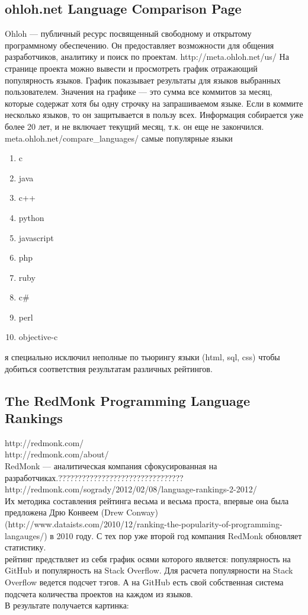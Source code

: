 \subsection{ohloh.net Language Comparison Page}
Ohloh --- публичный ресурс посвященный свободному и открытому программному обеспечению. Он предоставляет возможности для общения разработчиков, аналитику и поиск по проектам. 
http://meta.ohloh.net/us/
На странице проекта можно вывести и просмотреть график отражающий популярность языков.
График показывает результаты для языков выбранных пользователем. Значения на графике --- это сумма все коммитов за месяц, которые содержат хотя бы одну строчку на 
запрашиваемом языке. Если в коммите несколько языков, то он защитывается в пользу всех. Информация собирается уже более 20 лет, и не включает текущий месяц, т.к. он еще не закончился.\\
meta.ohloh.net/compare\_languages/
самые популярные языки\\
\begin{enumerate}
\item c
\item java
\item c++
\item python
\item javascript
\item php
\item ruby
\item c\#
\item perl
\item objective-c
\end{enumerate}
я специально исключил неполные по тьюрингу языки (html, sql, css) чтобы добиться соответствия результатам различных рейтингов.

\subsection{The RedMonk Programming Language Rankings}
http://redmonk.com/\\
http://redmonk.com/about/\\
RedMonk --- аналитическая компания сфокусированная на разработчиках.????????????????????????????????\\
http://redmonk.com/sogrady/2012/02/08/language-rankings-2-2012/\\
Их методика составления рейтинга весьма и весьма проста, впервые она была предложена Дрю Конвеем (Drew Conway) 
(http://www.dataists.com/2010/12/ranking-the-popularity-of-programming-langauges/) в 2010 году. С тех пор уже второй год компания RedMonk 
обновляет статистику.\\
рейтинг предствляет из себя график осями которого является: популярность на GitHub  и популярность на Stack Overflow.
Для расчета популярности на Stack Overflow ведется подсчет тэгов. А на GitHub есть свой собственная система подсчета количества проектов на каждом из языков.\\
В результате получается картинка:	

